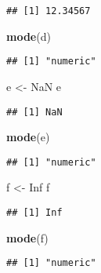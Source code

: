 \documentclass[
]{article}
\newenvironment{Shaded}{\begin{snugshade}}{\end{snugshade}}
\newcommand{\ConstantTok}[1]{\textcolor[rgb]{0.56,0.35,0.01}{#1}}
\newcommand{\FunctionTok}[1]{\textcolor[rgb]{0.13,0.29,0.53}{\textbf{#1}}}
\newcommand{\NormalTok}[1]{#1}
\newcommand{\OtherTok}[1]{\textcolor[rgb]{0.56,0.35,0.01}{#1}}
\begin{document}
\begin{verbatim}
## [1] 12.34567
\end{verbatim}

\begin{Shaded}
\begin{Highlighting}[]
\FunctionTok{mode}\NormalTok{(d)}
\end{Highlighting}
\end{Shaded}

\begin{verbatim}
## [1] "numeric"
\end{verbatim}

\begin{Shaded}
\begin{Highlighting}[]
\NormalTok{e }\OtherTok{\textless{}{-}} \ConstantTok{NaN}
\NormalTok{e}
\end{Highlighting}
\end{Shaded}

\begin{verbatim}
## [1] NaN
\end{verbatim}

\begin{Shaded}
\begin{Highlighting}[]
\FunctionTok{mode}\NormalTok{(e)}
\end{Highlighting}
\end{Shaded}

\begin{verbatim}
## [1] "numeric"
\end{verbatim}

\begin{Shaded}
\begin{Highlighting}[]
\NormalTok{f }\OtherTok{\textless{}{-}} \ConstantTok{Inf} 
\NormalTok{f}
\end{Highlighting}
\end{Shaded}

\begin{verbatim}
## [1] Inf
\end{verbatim}

\begin{Shaded}
\begin{Highlighting}[]
\FunctionTok{mode}\NormalTok{(f)}
\end{Highlighting}
\end{Shaded}

\begin{verbatim}
## [1] "numeric"
\end{verbatim}
\end{document}
